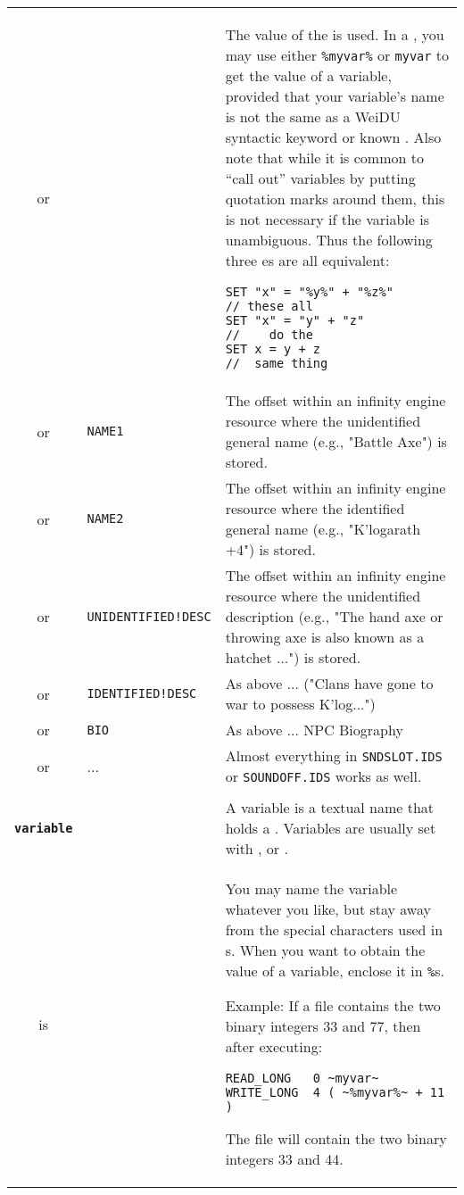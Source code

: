 \documentclass{article}
\def\ttref#1{\ahrefloc{#1}{\tt #1}}
\def\DEFINE#1{{\tt \bf #1}\label{#1}\index{#1}}
\def\t#1{{\tt #1}}
\begin{document}
\begin{tabular}{cp{10in}|p{10in}}
or & \ttref{variable} &
    The value of the \ttref{variable} is used.
  In a \ttref{patch} \ttref{value}, you may use either \t{\%myvar\%} or
  \t{myvar} to get the value of a variable, provided that your variable's
  name is not the same as a WeiDU syntactic keyword or known
  \ttref{constant}. Also note that while it is common to ``call out''
  variables by putting quotation marks around them, this is not necessary
  if the variable is unambiguous. Thus the following three \ttref{patch}es
  are all equivalent:
\begin{verbatim}
SET "x" = "%y%" + "%z%"       // these all
SET "x" = "y" + "z"           //    do the
SET x = y + z                 //  same thing
\end{verbatim} \\

or & \t{NAME1}   & The offset within an infinity engine resource where the unidentified general name (e.g., "Battle Axe") is stored. \\
or & \t{NAME2}   & The offset within an infinity engine resource where the identified general name (e.g., "K'logarath +4") is stored. \\
or & \t{UNIDENTIFIED!DESC}  & The offset within an infinity engine resource where the unidentified description (e.g., "The hand axe or throwing axe is also known as a hatchet ...") is stored. \\
or & \t{IDENTIFIED!DESC}    & As above ... ("Clans have gone to war to possess K'log...")\\
or & \t{BIO}                & As above ... NPC Biography\\
or & ...        & Almost everything in \t{SNDSLOT.IDS} or \t{SOUNDOFF.IDS}
works as well. \\

\\

\DEFINE{variable} & & A variable is a textual name that holds a
\ttref{value}. Variables are usually set with \ttref{READ!BYTE},
\ttref{SET} or \ttref{SPRINT}. \\
is & \ttref{String} & You may name the variable whatever you like, but stay
away from the special characters used in \ttref{regexp}s. When you want to
obtain the value of a variable, enclose it in \t{\%}s.


Example: If a file contains the two binary integers 33 and 77, then after
executing:

\begin{verbatim}
READ_LONG   0 ~myvar~
WRITE_LONG  4 ( ~%myvar%~ + 11 )
\end{verbatim}

The file will contain the two binary integers 33 and 44. \\

\end{tabular}
\end{document}
